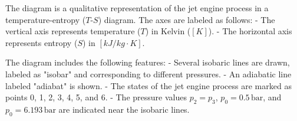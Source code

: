 The diagram is a qualitative representation of the jet engine process in a temperature-entropy (\(T\)-\(S\)) diagram. The axes are labeled as follows:  
- The vertical axis represents temperature (\(T\)) in Kelvin (\([K]\)).  
- The horizontal axis represents entropy (\(S\)) in \([kJ/kg·K]\).  

The diagram includes the following features:  
- Several isobaric lines are drawn, labeled as "isobar" and corresponding to different pressures.  
- An adiabatic line labeled "adiabat" is shown.  
- The states of the jet engine process are marked as points 0, 1, 2, 3, 4, 5, and 6.  
- The pressure values \(p_2 = p_3\), \(p_0 = 0.5 \, \text{bar}\), and \(p_0 = 6.193 \, \text{bar}\) are indicated near the isobaric lines.